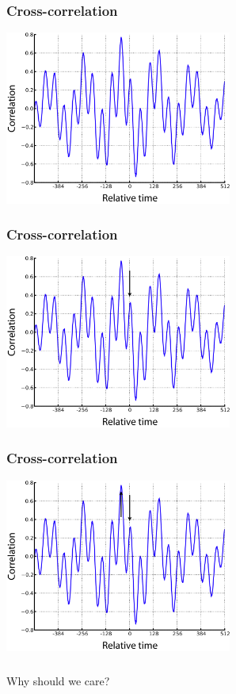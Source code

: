 \documentclass{beamer}
\begin{document}
\begin{frame}
\frametitle{Cross-correlation}
\includegraphics[height=5.7cm]{figures/outa_phase_xcorr}
\end{frame}

\begin{frame}
\frametitle{Cross-correlation}
\includegraphics[height=5.7cm]{figures/outa_phase_xcorr_w_arrow}
\end{frame}

\begin{frame}
\frametitle{Cross-correlation}
\includegraphics[height=5.7cm]{figures/outa_phase_xcorr_w_two_arrows}
\end{frame}

\begin{frame}
\frametitle{}
Why should we care? 
\end{frame}
\end{document}

